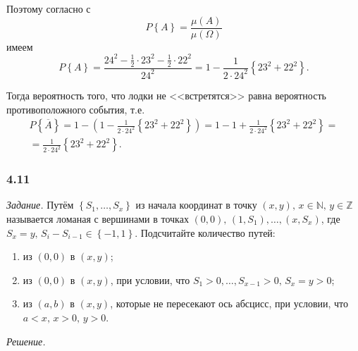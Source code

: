 Поэтому согласно с
$$P \left\{ A \right\} =
\frac{ \mu \left( A \right) }{ \mu \left( \Omega \right) }$$
имеем
$$P \left\{ A \right\} =
\frac{24^2 - \frac{1}{2} \cdot 23^2 - \frac{1}{2} \cdot 22^2}{24^2} =
1 - \frac{1}{2 \cdot 24^2} \left\{ 23^2 + 22^2 \right\}.$$

Тогда вероятность того, что лодки не <<встретятся>> равна вероятность противоположного события, т.е.
\begin{equation*}
\begin{split}
P \left\{ \overline{A} \right\} =
1 - \left( 1 - \frac{1}{2 \cdot 24^2} \left\{ 23^2 + 22^2 \right\} \right) =
1 - 1 + \frac{1}{2 \cdot 24^2} \left\{ 23^2 + 22^2 \right\} = \\
= \frac{1}{2 \cdot 24^2} \left\{ 23^2 + 22^2 \right\}.
\end{split}
\end{equation*}

\subsubsection*{4.11}

\textit{Задание.}
Путём $ \left\{ S_1, \dotsc, S_x \right\} $
из начала координат в точку
$ \left( x, y \right), \,
x \in \mathbb{N}, \,
y \in \mathbb{Z}$
называется ломаная с вершинами в точках
$ \left( 0, 0 \right), \, \left( 1, S_1 \right), \dotsc, \left( x, S_x \right) $, где $S_x = y, \, S_i - S_{i-1} \in \left\{ -1, 1 \right\} $.
Подсчитайте количество путей:
\begin{enumerate}[label=\alph*)]
\item из $ \left( 0, 0 \right) $ в $ \left( x, y \right) $;
\item из $ \left( 0, 0 \right) $ в $ \left( x, y \right) $, при условии, что $S_1 > 0, \dotsc, S_{x-1} > 0, \, S_x = y > 0$;
\item из $ \left( a, b \right) $ в $ \left( x, y \right) $, которые не пересекают ось абсцисс, при условии, что $a < x, \, x > 0, \, y > 0$.
\end{enumerate}

\textit{Решение.}

